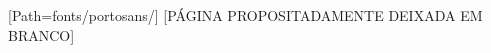 \thispagestyle{empty}

\vspace*{\fill}

\begin{center}
	[Path=fonts/portosans/]
	\uppercase{[Página propositadamente deixada em branco]}
\end{center}

\vspace*{\fill}
\newpage